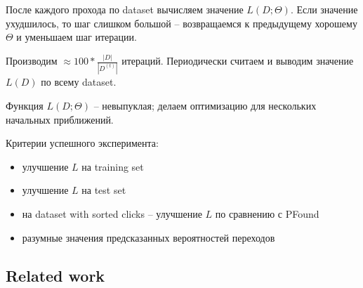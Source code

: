 \documentclass[12pt,a4paper]{article}
\begin{document}

После каждого прохода по dataset вычисляем значение $L(D; \Theta)$. Если значение ухудшилось, то шаг слишком большой -- возвращаемся к предыдущему хорошему $\Theta$ и уменьшаем шаг итерации.

Производим $\approx 100 * \frac{|D|}{|D^{(t)}|}$ итераций. Периодически считаем и выводим значение $L(D)$ по всему dataset.

Функция $L(D; \Theta)$ -- невыпуклая; делаем оптимизацию для нескольких начальных приближений.


Критерии успешного эксперимента:
\begin{itemize}
 \item улучшение $L$ на training set
 \item улучшение $L$ на test set
 \item на dataset with sorted clicks -- улучшение $L$ по сравнению с PFound
 \item разумные значения предсказанных вероятностей переходов
\end{itemize}

\subsection{Related work}
\end{document}
